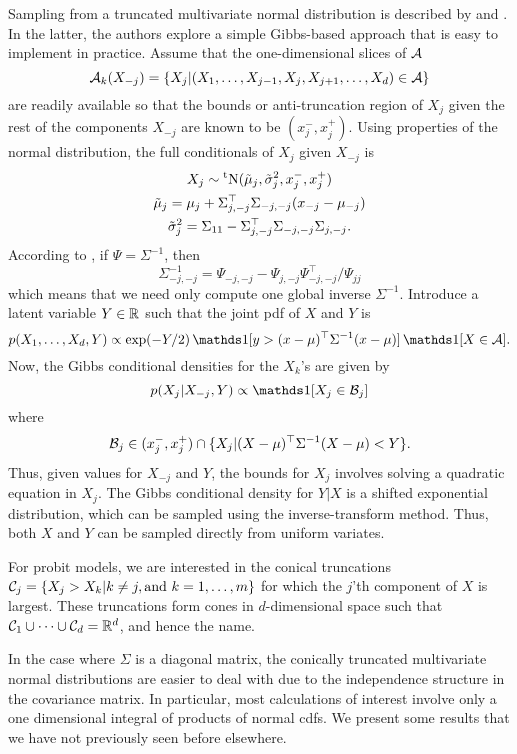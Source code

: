 Sampling from a truncated multivariate normal distribution is described by \citet{robert1995simulation} and \citet{damien2001sampling}.
In the latter, the authors explore a simple Gibbs-based approach that is easy to implement in practice.
Assume that the one-dimensional slices of ${\mathcal A}$ 
\[
  {\mathcal A}_k(X_{-j}) = \{X_j | (X_1,\dots,X_{j-1},X_j, X_{j+1},\dots,X_d) \in {\mathcal A} \}
\]
are readily available so that the bounds or anti-truncation region of $X_j$ given the rest of the components $X_{-j}$ are known to be $(x_j^-, x_j^+)$.
Using properties of the normal distribution, the full conditionals of $X_j$ given $X_{-j}$ is
\begin{gather*}
  X_j \sim \operatorname{{}^tN}(\tilde\mu_j,\tilde\sigma_j^2, x_j^-, x_j^+) \\
  \tilde\mu_j = \mu_{j} + \Sigma_{j,-j}^\top\Sigma_{-j,-j}(x_{-j} - \mu_{-j}) \\
  \tilde\sigma_j^2 = \Sigma_{11} - \Sigma_{j,-j}^\top \Sigma_{-j,-j} \Sigma_{j,-j}.
\end{gather*}
According to \citet{robert1995simulation}, if $\Psi = \Sigma^{-1}$, then 
\[
  \Sigma_{-j,-j}^{-1} = \Psi_{-j,-j} - \Psi_{j,-j}\Psi_{-j,-j}^\top / \Psi_{jj}
\]
which means that we need only compute one global inverse $\Sigma^{-1}$.
Introduce a latent variable $Y \in \mathbb{R}$ such that the joint pdf of $X$ and $Y$ is
\[
  p(X_1,\dots,X_d,Y) \propto \exp(-Y/2) \ind[y > (x-\mu)^\top\Sigma^{-1}(x-\mu)]\ind[X\in\cA].
\]
Now, the Gibbs conditional densities for the $X_k$'s are given by
\[
  p(X_j|X_{-j},Y) \propto \ind[X_j \in \cB_j]
\]
where
\[
  {\mathcal B}_j \in (x_j^-, x_j^+) \cap \{X_j | (X-\mu)^\top\Sigma^{-1}(X-\mu) < Y \}.
\]
Thus, given values for $X_{-j}$ and $Y$, the bounds for $X_j$ involves solving a quadratic equation in $X_j$.
The Gibbs conditional density for $Y|X$ is a shifted exponential distribution, which can be sampled using the inverse-transform method.
Thus, both $X$ and $Y$ can be sampled directly from uniform variates.

For probit models, we are interested in the conical truncations ${\mathcal C}_j = \{ X_j > X_k | k\neq j, \text{and } k=1,\dots,m  \}$ for which the $j$'th component of $X$ is largest.
These truncations form cones in $d$-dimensional space such that ${\mathcal C}_1 \cup \cdots \cup {\mathcal C}_d = \mathbb{R}^d$, and hence the name.

In the case where $\Sigma$ is a diagonal matrix, the conically truncated multivariate normal distributions are easier to deal with due to the independence structure in the covariance matrix.
In particular, most calculations of interest involve only a one dimensional integral of products of normal cdfs.
We present some results that we have not previously seen before elsewhere.

